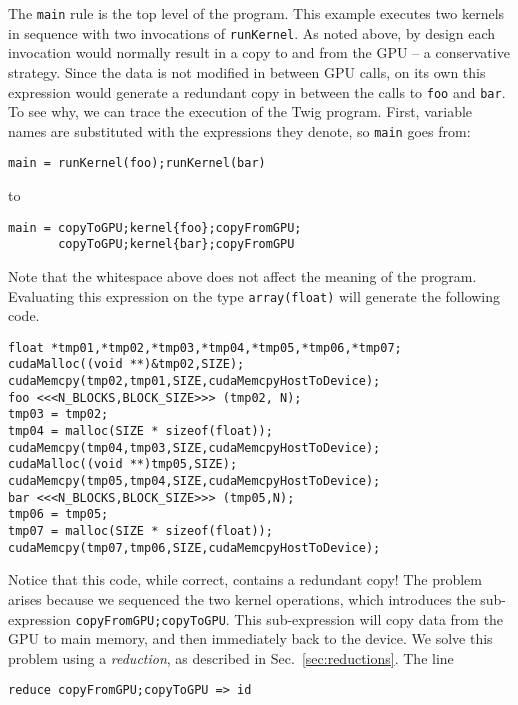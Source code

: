 The \texttt{main} rule is the top level of the program. This example executes two kernels in sequence with two invocations of \texttt{runKernel}. As noted above, by design each invocation would normally result in a copy to and from the GPU -- a conservative strategy. Since the data is not modified in between GPU calls, on its own this expression would generate a redundant copy in between the calls to \texttt{foo} and \texttt{bar}. To see why, we can trace the execution of the Twig program. First, variable names are substituted with the expressions they denote, so \texttt{main} goes from:

\begin{verbatim}
main = runKernel(foo);runKernel(bar)
\end{verbatim}

to 

\begin{verbatim}
main = copyToGPU;kernel{foo};copyFromGPU;
       copyToGPU;kernel{bar};copyFromGPU
\end{verbatim}

Note that the whitespace above does not affect the meaning of the program. Evaluating this expression on the type \texttt{array(float)} will generate the following code.

\begin{verbatim}
float *tmp01,*tmp02,*tmp03,*tmp04,*tmp05,*tmp06,*tmp07;
cudaMalloc((void **)&tmp02,SIZE);
cudaMemcpy(tmp02,tmp01,SIZE,cudaMemcpyHostToDevice);
foo <<<N_BLOCKS,BLOCK_SIZE>>> (tmp02, N);
tmp03 = tmp02;
tmp04 = malloc(SIZE * sizeof(float));
cudaMemcpy(tmp04,tmp03,SIZE,cudaMemcpyHostToDevice);
cudaMalloc((void **)tmp05,SIZE);
cudaMemcpy(tmp05,tmp04,SIZE,cudaMemcpyHostToDevice);
bar <<<N_BLOCKS,BLOCK_SIZE>>> (tmp05,N);
tmp06 = tmp05;
tmp07 = malloc(SIZE * sizeof(float));
cudaMemcpy(tmp07,tmp06,SIZE,cudaMemcpyHostToDevice);
\end{verbatim}

Notice that this code, while correct, contains a redundant copy! The problem arises because we sequenced the two kernel operations, which introduces the sub-expression \texttt{copyFromGPU;copyToGPU}. This sub-expression will copy data from the GPU to main memory, and then immediately back to the device. We solve this problem using a \emph{reduction}, as described in Sec.~\ref{sec:reductions}. The line

\begin{verbatim}
reduce copyFromGPU;copyToGPU => id
\end{verbatim}

